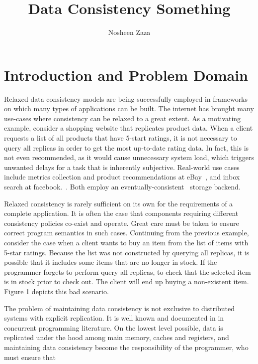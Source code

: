 \documentclass[]{usiinfprospectus}
\author{Nosheen Zaza}
\title{Data Consistency Something}
\begin{document}
\maketitle


\section{Introduction and Problem Domain}

Relaxed data consistency models are being successfully employed in frameworks on which many types of applications can be built. The internet has brought many use-cases where consistency can be relaxed to a great extent. As a motivating example, consider a shopping website that replicates product data. When a client requests a list of all products that have 5-start ratings, it is not necessary to query all replicas in order to get the most up-to-date rating data. In fact, this is not even recommended, as it would cause unnecessary system load, which triggers unwanted delays for a task that is inherently subjective. Real-world use cases include metrics collection and product recommendations at eBay~\cite{Lakshman:2010:CDS:1773912.1773922}, and inbox search at facebook.~\cite{cassandraebay}. Both employ an eventually-consistent~\cite{vogels2009eventually} storage backend.


Relaxed consistency is rarely sufficient on its own for the requirements of a complete application. It is often the case that components requiring different consistency policies co-exist and operate. Great care must be taken to ensure correct program semantics in such cases. Continuing from the previous example, consider the case when a client wants to buy an item from the list of items with 5-star ratings. Because the list was not constructed by querying all replicas, it is possible that it includes some items that are no longer in stock. If the programmer forgets to perform query all replicas, to check that the selected item is in stock prior to check out. The client will end up buying a non-existent item. Figure 1 depicts this bad scenario.


The problem of maintaining data consistency is not exclusive to distributed systems with explicit replication. It is well known and documented in in concurrent programming literature. On the lowest level possible, data is replicated under the hood among main memory, caches and registers, and maintaining data consistency become the responsibility of the programmer, who must ensure that 
\end{document}
